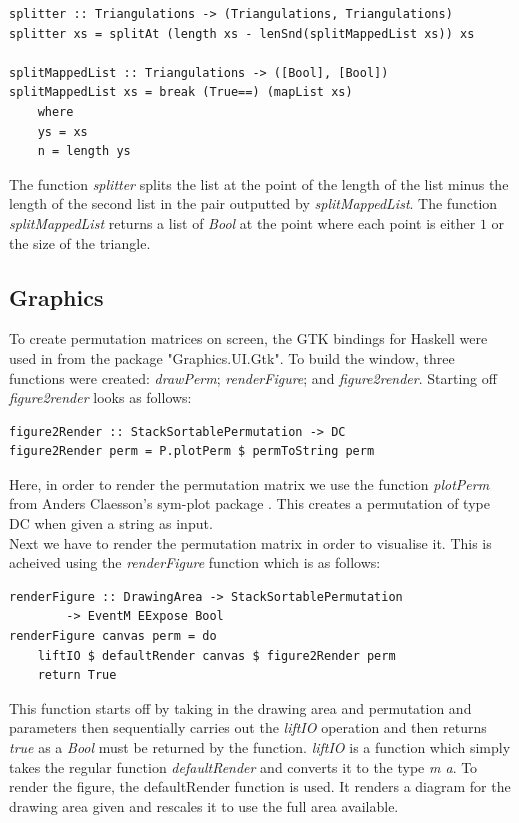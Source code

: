 \documentclass[12pt]{article}
\begin{document}
\begin{lstlisting}
splitter :: Triangulations -> (Triangulations, Triangulations)
splitter xs = splitAt (length xs - lenSnd(splitMappedList xs)) xs

splitMappedList :: Triangulations -> ([Bool], [Bool])
splitMappedList xs = break (True==) (mapList xs)
	where
	ys = xs
	n = length ys 
\end{lstlisting}
The function {\it splitter} splits the list at the point of the length of the list minus the length of the second list in the pair outputted by {\it splitMappedList}. The function {\it splitMappedList} returns a list of {\it Bool} at the point where each point is either $1$ or the size of the triangle.

\subsection{Graphics}
To create permutation matrices on screen, the GTK bindings for Haskell were used in from the package "Graphics.UI.Gtk". To build the window, three functions were created: {\it drawPerm}; {\it renderFigure}; and {\it figure2render}. Starting off {\it figure2render} looks as follows:
\begin{lstlisting}
figure2Render :: StackSortablePermutation -> DC 
figure2Render perm = P.plotPerm $ permToString perm
\end{lstlisting}
Here, in order to render the permutation matrix we use the function {\it plotPerm} from Anders Claesson's sym-plot package \cite{ClaessonSymPlot}. This creates a permutation of type DC when given a string as input.\\
Next we have to render the permutation matrix in order to visualise it. This is acheived using the {\it renderFigure} function which is as follows:
\begin{lstlisting}
renderFigure :: DrawingArea -> StackSortablePermutation 
		-> EventM EExpose Bool
renderFigure canvas perm = do
	liftIO $ defaultRender canvas $ figure2Render perm
	return True
\end{lstlisting}
This function starts off by taking in the drawing area and permutation and parameters then sequentially carries out the {\it liftIO} operation and then returns {\it true} as a {\it Bool} must be returned by the function. {\it liftIO} is a function which simply takes the regular function {\it defaultRender} and converts it to the type {\it m a}. To render the figure, the defaultRender function is used. It renders a diagram for the drawing area given and rescales it to use the full area available.\\
\end{document}
